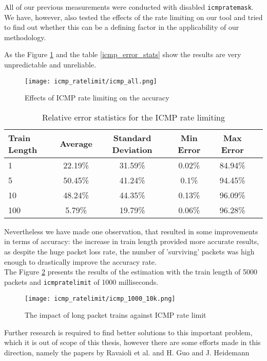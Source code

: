 All of our previous measurements were conducted with disabled \texttt{icmp\textunderscore ratemask}. We have, however, also tested the effects of the rate limiting on our tool and tried to find out whether this can be a defining factor in the applicability of our methodology. 

As the Figure \ref{icmp_all} and the table \ref{icmp_error_stats} show the results are very unpredictable and unreliable.

\begin{figure}[H]
 \centering
 \texttt{[image: icmp\_ratelimit/icmp\_all.png]}
 \caption{Effects of ICMP rate limiting on the accuracy}
 \label{icmp_all}
\end{figure}


\begin{table}[h!]
  \centering
  \caption{Relative error statistics for the ICMP rate limiting}
  \label{icmp_error_stats}
\begin{tabular}{l|c|c|c|c|c}
\toprule
 Train Length & Average & Standard Deviation & Min Error & Max Error \\ \midrule
  \label{}
	1 & 22.19\% & 31.59\% & 0.02\% & 84.94\% \\
	5 & 50.45\% & 41.24\% & 0.1\% & 94.45\% \\
	10 & 48.24\% & 44.35\% & 0.13\% & 96.09\% \\
	100 & 5.79\% & 19.79\% & 0.06\% & 96.28\% \\ \bottomrule
  \end{tabular}      
\end{table}

Nevertheless we have made one observation, that resulted in some improvements in terms of accuracy: the increase in train length provided more accurate results, as despite the huge packet loss rate, the number of 'surviving' packets was high enough to drastically improve the accuracy rate. \\
The Figure \ref{icmp_1000} presents the results of the estimation with the train length of 5000 packets and \texttt{icmp\textunderscore ratelimit} of 1000 milliseconds.

\begin{figure}[H]
 \centering
 \texttt{[image: icmp\_ratelimit/icmp\_1000\_10k.png]}
 \caption{The impact of long packet trains against ICMP rate limit}
 \label{icmp_1000}
\end{figure}


Further research is required to find better solutions to this important problem, which it is out of scope of this thesis, however there are some efforts made in this direction, namely the papers by Ravaioli et al. \cite{RaUrBa_icmp} and H. Guo and J. Heidemann\cite{fader2017}

